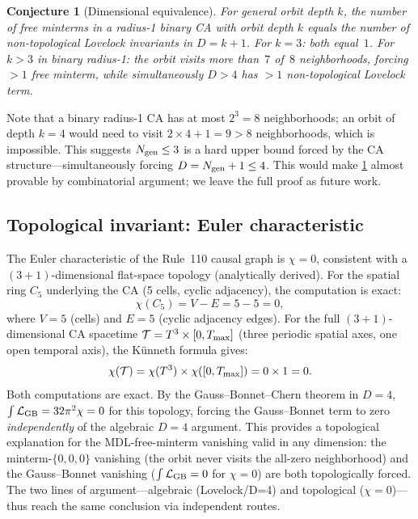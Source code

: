 \documentclass[11pt]{article}
\newtheorem{conjecture}[theorem]{Conjecture}
\theoremstyle{remark}
\newcommand{\CatAD}{analytically derived}
\newcommand{\Ngen}{N_{\rm gen}}
\begin{document}
\begin{conjecture}[Dimensional equivalence]
\label{conj:dim_equiv}
For general orbit depth $k$, the number of free minterms in a radius-1
binary CA with orbit depth $k$ equals the number of non-topological Lovelock
invariants in $D = k + 1$.
For $k = 3$: both equal~$1$.
For $k > 3$ in binary radius-1: the orbit visits more than~$7$ of~$8$
neighborhoods, forcing $> 1$ free minterm, while simultaneously $D > 4$
has $> 1$ non-topological Lovelock term.
\end{conjecture}

Note that a binary radius-1 CA has at most $2^3 = 8$ neighborhoods; an orbit
of depth $k = 4$ would need to visit $2 \times 4 + 1 = 9 > 8$ neighborhoods,
which is impossible.
This suggests $\Ngen \leq 3$ is a hard upper bound forced by the CA
structure---simultaneously forcing $D = \Ngen + 1 \leq 4$.
This would make \cref{conj:dim_equiv} almost provable by combinatorial
argument; we leave the full proof as future work.

\subsection{Topological invariant: Euler characteristic}
\label{ssec:euler}

The Euler characteristic of the Rule~110 causal graph is $\chi = 0$,
consistent with a $(3+1)$-dimensional flat-space topology (\CatAD).
For the spatial ring $C_5$ underlying the CA (5 cells, cyclic adjacency),
the computation is exact:
\begin{equation}
  \chi(C_5) = V - E = 5 - 5 = 0,
  \label{eq:euler_c5}
\end{equation}
where $V = 5$ (cells) and $E = 5$ (cyclic adjacency edges).
For the full $(3+1)$-dimensional CA spacetime
$\mathcal{T} = T^3 \times [0, T_{\rm max}]$
(three periodic spatial axes, one open temporal axis), the
K\"{u}nneth formula gives:
\begin{equation}
  \chi(\mathcal{T}) = \chi(T^3) \times \chi([0, T_{\rm max}])
  = 0 \times 1 = 0.
  \label{eq:euler_kuenneth}
\end{equation}
Both computations are exact.
By the Gauss--Bonnet--Chern theorem in $D = 4$,
$\int \mathcal{L}_{\rm GB} = 32\pi^2 \chi = 0$ for this topology,
forcing the Gauss--Bonnet term to zero \emph{independently} of the algebraic
$D = 4$ argument.
This provides a topological explanation for the MDL-free-minterm
vanishing valid in any dimension: the minterm-$\{0,0,0\}$ vanishing
(the orbit never visits the all-zero neighborhood)
and the Gauss--Bonnet vanishing ($\int \mathcal{L}_{\rm GB} = 0$
for $\chi = 0$) are both topologically forced.
The two lines of argument---algebraic (Lovelock/D=4) and topological
($\chi = 0$)---thus reach the same conclusion via independent routes.
\end{document}
